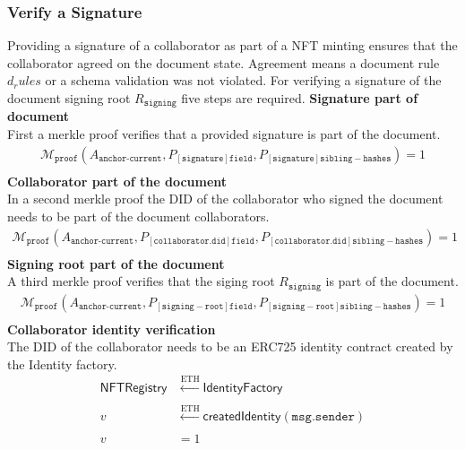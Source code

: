 \subsubsection{Verify a Signature}
Providing a signature of a collaborator as part of a NFT minting ensures that the collaborator agreed on the document state. Agreement means a document rule $d_rules$ or a schema validation was not violated. For verifying a signature of the document signing root $R_\mathtt{signing}$ five steps are required.
\textbf{Signature part of document} \\
First a merkle proof verifies that a provided signature is part of the document.
\begin{equation}
\begin{split}
\mathcal{M}_{\texttt{proof}}(A_{\texttt{anchor-current}} ,P_{[\mathtt{signature}]\mathtt{field}},P_{[\mathtt{signature}]\mathtt{sibling-hashes}}) = 1 \\
\end{split}
\end{equation}
\textbf{Collaborator part of the document} \\
In a second merkle proof the DID of the collaborator who signed the document needs to be part of the document collaborators.
\begin{equation}
\begin{split}
\mathcal{M}_{\texttt{proof}}(A_{\texttt{anchor-current}} ,P_{[\mathtt{collaborator.did}]\mathtt{field}},P_{[\mathtt{collaborator.did}]\mathtt{sibling-hashes}}) = 1 \\
\end{split}
\end{equation}
\textbf{Signing root part of the document} \\
A third merkle proof verifies that the siging root $R_\mathtt{signing}$ is part of the document.
\begin{equation}
\begin{split}
\mathcal{M}_{\texttt{proof}}(A_{\texttt{anchor-current}} ,P_{[\mathtt{signing-root}]\mathtt{field}},P_{[\mathtt{signing-root}]\mathtt{sibling-hashes}}) = 1 \\
\end{split}
\end{equation}
\textbf{Collaborator identity verification} \\
The DID of the collaborator needs to be an ERC725 identity contract created by the Identity factory.
\begin{equation}
\begin{split}
\mathsf{NFTRegistry} &\xleftarrow[]{\text{ETH}}  \mathsf{IdentityFactory} \\
v &\xleftarrow[]{\text{ETH}} \textsf{createdIdentity}(\mathtt{msg.sender}) \\
v & = 1
\end{split}
\end{equation}
